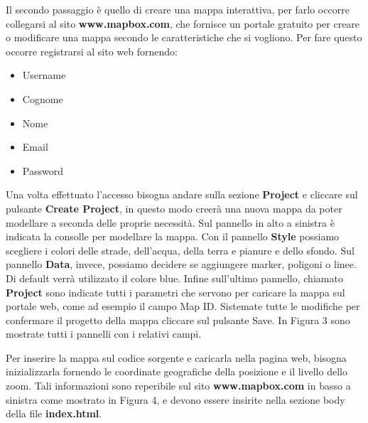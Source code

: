 \documentclass[a4paper,11pt]{article}
\newcommand{\tab}[1]{\hspace{.3\textwidth}\rlap{#1}}
\begin{document}
\begin{enumerate}
\begin{enumerate}
Il secondo passaggio è quello di creare una mappa interattiva, per farlo occorre collegarsi al sito \textbf{www.mapbox.com}, che fornisce un portale gratuito per creare o modificare una mappa secondo le caratteristiche che si vogliono.\newline
Per fare questo occorre registrarsi al sito web fornendo:
			\smallskip
			\begin{itemize}
				\item Username
				\item Cognome
				\item Nome
				\item Email
				\item Password
			\end{itemize}
			\smallskip
			\medskip
Una volta effettuato l'accesso bisogna andare sulla sezione \textbf{Project} e cliccare sul pulsante \textbf{Create Project}, in questo modo creerà una nuova mappa da poter modellare a seconda delle proprie necessità.\newline
Sul pannello in alto a sinistra è indicata la consolle per modellare la mappa. Con il pannello \textbf{Style} possiamo scegliere i colori delle strade, dell'acqua, della terra e pianure e dello sfondo.\newline
Sul pannello \textbf{Data}, invece, possiamo decidere se aggiungere marker, poligoni o linee. Di default verrà utilizzato il colore blue.
Infine sull'ultimo pannello, chiamato \textbf{Project} sono indicate tutti i parametri che servono per caricare la mappa sul portale web, come ad esempio il campo Map ID.
Sistemate tutte le modifiche per confermare il progetto della mappa cliccare sul pulsante Save.\newline
In Figura 3 sono mostrate tutti i pannelli con i relativi campi.
			\newpage
			\begin{figure}[!ht]
				
			\end{figure}
			\tab{\textbf{Figura 3}}
				\newline				
			\medskip
			
Per inserire la mappa sul codice sorgente e caricarla nella pagina web, bisogna inizializzarla fornendo le coordinate geografiche della posizione e il livello dello zoom.
Tali informazioni sono reperibile sul sito \textbf{www.mapbox.com} in basso a sinistra come mostrato in Figura 4, e devono essere insirite nella sezione body della file \textbf{index.html}.
			\begin{figure}[!ht]
			

\end{figure}
\end{enumerate}
\end{enumerate}
\end{document}
